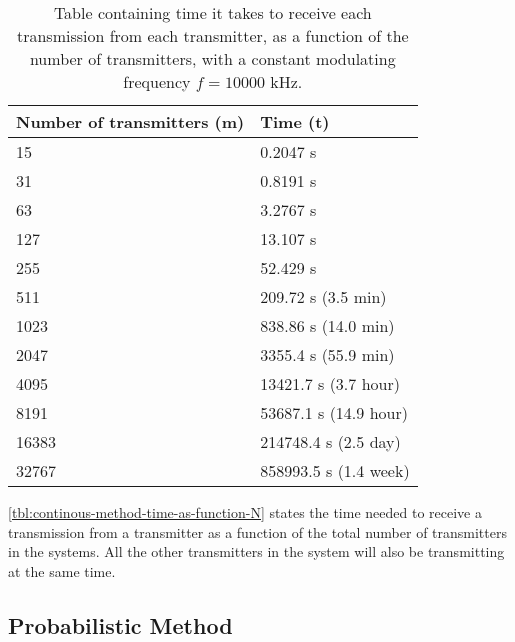 \begin{table}[h]
	\centering
	\begin{tabular}{  | l | l | }

	\hline
	Number of transmitters (m)	& Time (t)					\\ \hline


	15							& 0.2047 s					\\ \hline
	31							& 0.8191 s					\\ \hline
	63							& 3.2767 s					\\ \hline
	127							& 13.107 s					\\ \hline
	255							& 52.429 s					\\ \hline
	511							& 209.72 s (3.5 min)		\\ \hline
	1023						& 838.86 s (14.0 min)		\\ \hline
	2047						& 3355.4 s (55.9 min)		\\ \hline
	4095						& 13421.7 s (3.7 hour)		\\ \hline
	8191						& 53687.1 s (14.9 hour)		\\ \hline
	16383						& 214748.4 s (2.5 day)		\\ \hline
	32767						& 858993.5 s (1.4 week)		\\ \hline



\end{tabular}
	\caption{Table containing time it takes to receive each transmission from each transmitter, as a function of the number of transmitters, with a constant modulating frequency $f = 10000$ kHz.}
	\label{tbl:continous-method-time-as-function-N}
\end{table}

\autoref{tbl:continous-method-time-as-function-N} states the time needed to receive a transmission from a transmitter as a function of the total number of transmitters in the systems. 
All the other transmitters in the system will also be transmitting at the same time.





\subsection{Probabilistic Method}



